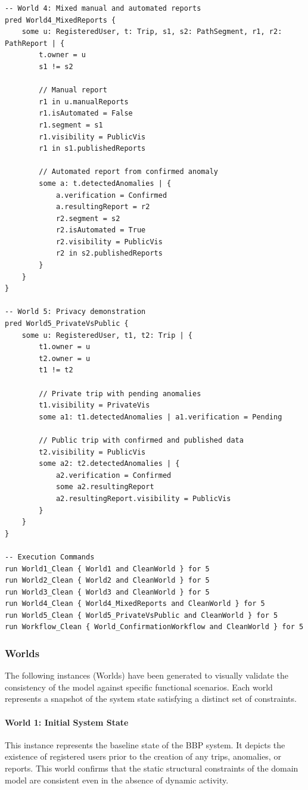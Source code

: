 \begin{lstlisting}[language=alloy]
-- World 4: Mixed manual and automated reports
pred World4_MixedReports {
    some u: RegisteredUser, t: Trip, s1, s2: PathSegment, r1, r2: PathReport | {
        t.owner = u
        s1 != s2
        
        // Manual report
        r1 in u.manualReports
        r1.isAutomated = False
        r1.segment = s1
        r1.visibility = PublicVis
        r1 in s1.publishedReports
        
        // Automated report from confirmed anomaly
        some a: t.detectedAnomalies | {
            a.verification = Confirmed
            a.resultingReport = r2
            r2.segment = s2
            r2.isAutomated = True
            r2.visibility = PublicVis
            r2 in s2.publishedReports
        }
    }
}

-- World 5: Privacy demonstration
pred World5_PrivateVsPublic {
    some u: RegisteredUser, t1, t2: Trip | {
        t1.owner = u
        t2.owner = u
        t1 != t2
        
        // Private trip with pending anomalies
        t1.visibility = PrivateVis
        some a1: t1.detectedAnomalies | a1.verification = Pending
        
        // Public trip with confirmed and published data
        t2.visibility = PublicVis
        some a2: t2.detectedAnomalies | {
            a2.verification = Confirmed
            some a2.resultingReport
            a2.resultingReport.visibility = PublicVis
        }
    }
}

-- Execution Commands
run World1_Clean { World1 and CleanWorld } for 5
run World2_Clean { World2 and CleanWorld } for 5
run World3_Clean { World3 and CleanWorld } for 5
run World4_Clean { World4_MixedReports and CleanWorld } for 5
run World5_Clean { World5_PrivateVsPublic and CleanWorld } for 5
run Workflow_Clean { World_ConfirmationWorkflow and CleanWorld } for 5
\end{lstlisting}

\subsubsection{Worlds}

The following instances (Worlds) have been generated to visually validate the consistency of the model against specific functional scenarios. Each world represents a snapshot of the system state satisfying a distinct set of constraints.

\paragraph{World 1: Initial System State} This instance represents the baseline state of the BBP system. It depicts the existence of registered users prior to the creation of any trips, anomalies, or reports. This world confirms that the static structural constraints of the domain model are consistent even in the absence of dynamic activity.

